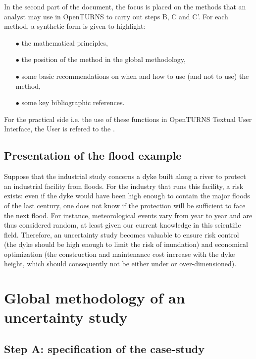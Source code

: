 In the second part of the document, the focus is placed on the methods that an analyst may use in OpenTURNS to carry out steps B, C and C'. For each method, a synthetic form is given to highlight:

\begin{itemize}

\item[$\bullet$] the mathematical principles,
\item[$\bullet$] the position of the method in the global methodology,
\item[$\bullet$] some basic recommendations on when and how to use (and not to use) the method,
\item[$\bullet$] some key bibliographic references.

\end{itemize}

For the practical side i.e. the use of these functions in OpenTURNS Textual User Interface, the User is refered to the .

\subsection{Presentation of the flood example}
\par

Suppose that the industrial study concerns a dyke built along a river to protect an industrial facility from floods. For the industry that runs this facility, a risk exists: even if the dyke would have been high enough to contain the major floods of the last century, one does not know if the protection will be sufficient to face the next flood. For instance, meteorological events vary from year to year and are thus considered random, at least given our current knowledge in this scientific field. Therefore, an uncertainty study becomes valuable to ensure risk control (the dyke should be high enough to limit the risk of inundation) and economical optimization (the construction and maintenance cost increase with the dyke height, which should consequently not be either under or over-dimensioned).

\newpage

\section{Global methodology of an uncertainty study}

\subsection{Step A: specification of the case-study}

